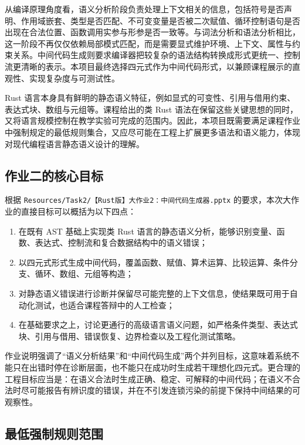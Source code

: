 \documentclass[UTF8,a4paper,12pt]{ctexart}
\newcommand{\pkg}[1]{\texttt{#1}}
\begin{document}
从编译原理角度看，语义分析阶段负责处理上下文相关的信息，包括符号是否声明、作用域嵌套、类型是否匹配、不可变变量是否被二次赋值、循环控制语句是否出现在合法位置、函数调用实参与形参是否一致等。与词法分析和语法分析相比，这一阶段不再仅仅依赖局部模式匹配，而是需要显式维护环境、上下文、属性与约束关系。中间代码生成则要求编译器把较复杂的语法结构转换成形式更统一、控制流更清晰的表示。本项目最终选择四元式作为中间代码形式，以兼顾课程展示的直观性、实现复杂度与可测试性。

Rust 语言本身具有鲜明的静态语义特征，例如显式的可变性、引用与借用约束、表达式块、数组与元组等。课程给出的类 Rust 语法在保留这些关键思想的同时，又将语言规模控制在教学实验可完成的范围内。因此，本项目既需要满足课程作业中强制规定的最低规则集合，又应尽可能在工程上扩展更多语法和语义能力，体现对现代编程语言静态语义设计的理解。

\subsection{作业二的核心目标}

根据 \pkg{Resources/Task2/【Rust版】大作业2：中间代码生成器.pptx} 的要求，本次大作业的直接目标可以概括为以下四点：

\begin{enumerate}[label=\arabic*.]
    \item 在既有 AST 基础上实现类 Rust 语言的静态语义分析，能够识别变量、函数、表达式、控制流和复合数据结构中的语义错误；
    \item 以四元式形式生成中间代码，覆盖函数、赋值、算术运算、比较运算、条件分支、循环、数组、元组等构造；
    \item 对静态语义错误进行诊断并保留尽可能完整的上下文信息，使结果既可用于自动化测试，也适合课程答辩中的人工检查；
    \item 在基础要求之上，讨论更通行的高级语言语义问题，如严格条件类型、表达式块、引用与借用、错误恢复、边界检查以及工程化测试策略。
\end{enumerate}

作业说明强调了“语义分析结果”和“中间代码生成”两个并列目标，这意味着系统不能只在出错时停在诊断层面，也不能只在成功时生成若干理想化四元式。更合理的工程目标应当是：在语义合法时生成正确、稳定、可解释的中间代码；在语义不合法时尽可能报告有辨识度的错误，并在不引发连锁污染的前提下保持中间结果的可观察性。

\subsection{最低强制规则范围}
\end{document}
